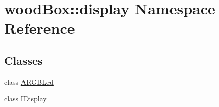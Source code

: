 \hypertarget{namespacewood_box_1_1display}{}\section{wood\+Box\+:\+:display Namespace Reference}
\label{namespacewood_box_1_1display}
\subsection*{Classes}
\begin{DoxyCompactItemize}
\item 
class \mbox{\hyperlink{classwood_box_1_1display_1_1_a_r_g_b_led}{A\+R\+G\+B\+Led}}
\item 
class \mbox{\hyperlink{classwood_box_1_1display_1_1_i_display}{I\+Display}}
\end{DoxyCompactItemize}
